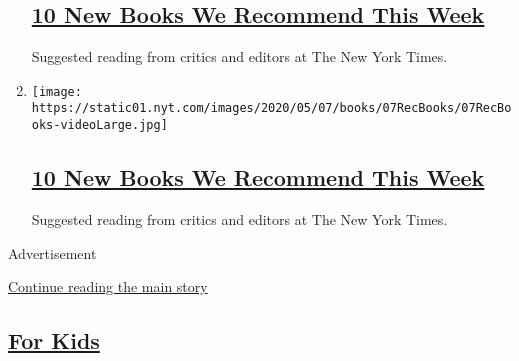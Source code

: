 \begin{enumerate}
{  \subsection{\texorpdfstring{\href{/2020/05/14/books/review/10-new-books-we-recommend-this-week.html}{10
  New Books We Recommend This
  Week}}{10 New Books We Recommend This Week}}\label{10-new-books-we-recommend-this-week-1}}

  Suggested reading from critics and editors at The New York Times.
\item
  \texttt{[image: https://static01.nyt.com/images/2020/05/07/books/07RecBooks/07RecBooks-videoLarge.jpg]}

  \hypertarget{10-new-books-we-recommend-this-week-2}{%
  \subsection{\texorpdfstring{\href{/2020/05/07/books/review/10-new-books-to-read-this-week.html}{10
  New Books We Recommend This
  Week}}{10 New Books We Recommend This Week}}\label{10-new-books-we-recommend-this-week-2}}

  Suggested reading from critics and editors at The New York Times.
\end{enumerate}

Advertisement

\protect\hyperlink{after-mid2}{Continue reading the main story}

\hypertarget{for-kids}{%
\subsection{\texorpdfstring{\protect\hyperlink{}{For
Kids}}{For Kids}}\label{for-kids}}

